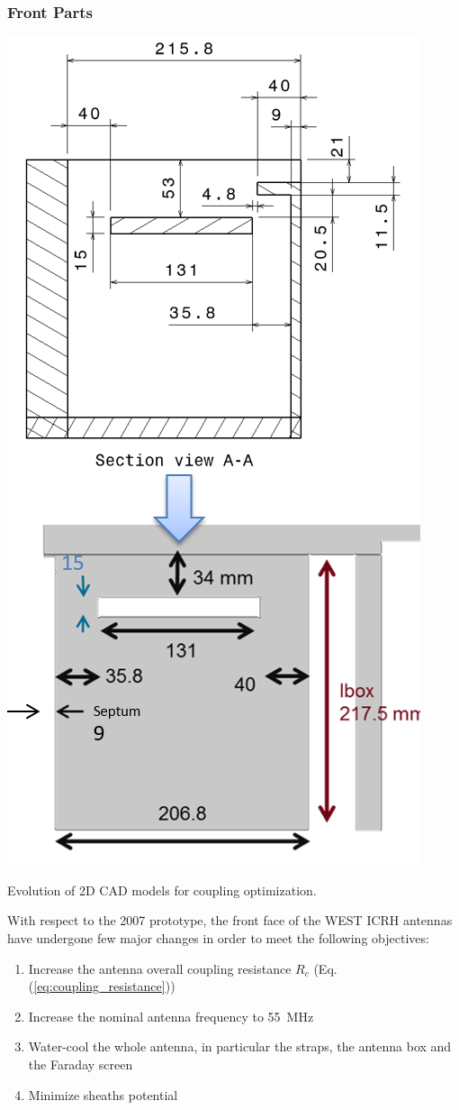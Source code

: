 \subsubsection{Front Parts}
\begin{marginfigure}[-1cm]
	\centering
	\includegraphics[width=0.8\linewidth]{figures/chap3/WEST_ICRH/WEST_front_face_evolution1}
	\caption{Evolution of 2D CAD models for coupling optimization.}
	\label{fig:westfrontfaceevolution1}
\end{marginfigure}

With respect to the 2007 prototype, the front face of the WEST ICRH antennas have undergone few major changes in order to meet the following objectives:
\begin{enumerate}
	\item Increase the antenna overall coupling resistance $R_c$ (Eq.(\ref{eq:coupling_resistance}))
	\item Increase the nominal antenna frequency to 55~MHz
	\item Water-cool the whole antenna, in particular the straps, the antenna box and the Faraday screen
	\item Minimize sheaths potential
\end{enumerate}

